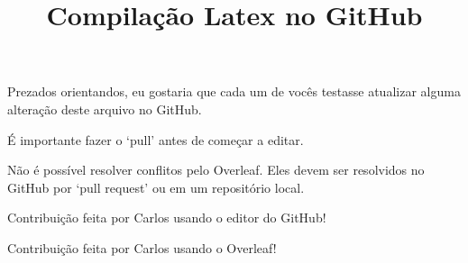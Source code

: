 \documentclass{article}
\title{Compilação Latex no GitHub}
\begin{document}
\maketitle

Prezados orientandos,
eu gostaria que cada um de vocês testasse atualizar alguma alteração deste arquivo no GitHub.

É importante fazer o `pull' antes de começar a editar.

Não é possível resolver conflitos pelo Overleaf.
Eles devem ser resolvidos no GitHub por `pull request' ou em um repositório local.

Contribuição feita por Carlos usando o editor do GitHub!

Contribuição feita por Carlos usando o Overleaf!
\end{document}
